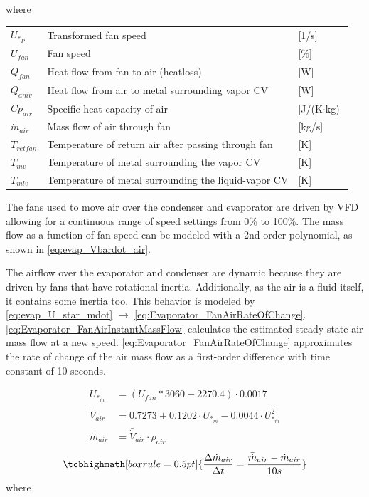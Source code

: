 where

\begin{center}
	\begin{tabular}{l p{10cm} l}
		$U_{*_P}$       & Transformed fan speed                                & [1/\si{s}]                        \\
		$U_{fan}$       & Fan speed                                            & [$\%$]                        \\
		$Q_{fan}$       & Heat flow from fan to air (heatloss)                 & [\si{W}]                          \\
		$Q_{amv}$       & Heat flow from air to metal surrounding vapor CV     & [\si{W}]                          \\
		$Cp_{air}$      & Specific heat capacity of air                        & [\si{J}/(\si{K}$ \cdot $\si{kg})] \\
		$\dot{m}_{air}$ & Mass flow of air through fan                         & [\si{kg}/\si{s}]                  \\
		$T_{retfan}$    & Temperature of return air after passing through fan  & [\si{K}]                          \\
		$T_{mv}$        & Temperature of metal surrounding the vapor CV        & [\si{K}]                          \\
		$T_{mlv}$       & Temperature of metal surrounding the liquid-vapor CV & [\si{K}]
	\end{tabular}
\end{center}

The fans used to move air over the condenser and evaporator are driven by VFD allowing for a continuous range of speed settings from 0\% to 100\%. The mass flow as a function of fan speed can be modeled with a 2nd order polynomial, as shown in \cref{eq:evap_Vbardot_air}.

The airflow over the evaporator and condenser are dynamic because they are driven by fans that have rotational inertia. Additionally, as the air is a fluid itself, it contains some inertia too. This behavior is modeled by \cref{eq:evap_U_star_mdot} $\rightarrow$ \cref{eq:Evaporator_FanAirRateOfChange}. \cref{eq:Evaporator_FanAirInstantMassFlow} calculates the estimated steady state air mass flow at a new speed. \cref{eq:Evaporator_FanAirRateOfChange} approximates the rate of change of the air mass flow as a first-order difference with time constant of 10 seconds.

\begin{align}
	U_{*_{\dot{m}}} & = (U_{fan}*3060 - 2270.4)\cdot 0.0017 \label{eq:evap_U_star_mdot}\\
	\bar{\dot{V}}_{air} & = 0.7273 + 0.1202 \cdot 	U_{*_{\dot{m}}}  -0.0044 \cdot 	U_{*_{\dot{m}}}^2	\label{eq:evap_Vbardot_air} \\
	\bar{\dot{m}}_{air} & = \bar{\dot{V}}_{air} \cdot \rho_{air}	\label{eq:Evaporator_FanAirInstantMassFlow}
\end{align}
\begin{equation}
	\tcbhighmath[boxrule = 0.5pt]{ 	\frac{\Delta \dot{m}_{air}}{\Delta t} = \frac{\bar{\dot{m}}_{air}  - \dot{m}_{air}}{10s}  }  \label{eq:Evaporator_FanAirRateOfChange}       
\end{equation}
where

